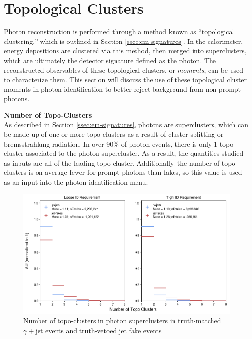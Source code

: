 \section{Topological Clusters}

Photon reconstruction is performed through a method known as ``topological clustering,'' which is outlined in Section \ref{ssec:em-signatures}. In the calorimeter, energy depositions are clustered via this method, then merged into superclusters, which are ultimately the detector signature defined as the photon. The reconstructed observables of these topological clusters, or \textit{moments}, can be used to characterize them. This section will discuss the use of these topological cluster moments in photon identification to better reject background from non-prompt photons.

\noindent\textbf{Number of Topo-Clusters}\\
\indent As described in Section \ref{ssec:em-signatures}, photons are  superclusters, which can be made up of one or more topo-clusters as a result of cluster splitting or bremsstrahlung radiation. In over 90\% of photon events, there is only 1 topo-cluster associated to the photon supercluster. As a result, the quantities studied as inputs are all of the leading topo-cluster. Additionally, the number of topo-clusters is on average fewer for prompt photons than fakes, so this value is used as an input into the photon identification menu.

\begin{figure}[!thp]
    \centering
    \includegraphics[width=.90\textwidth]{chapters/chapter4_photonID/images/hists/y_nTopoClusters.png}
    \caption[Number of topo-clusters in photon superclusters]
    {Number of topo-clusters in photon superclusters in truth-matched $\gamma+$jet events and truth-vetoed jet fake events} 
    \label{fig:topo-geom}
\end{figure}


